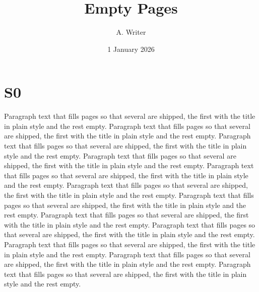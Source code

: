 \documentclass{article}
\title{Empty Pages}\author{A. Writer}\date{1 January 2026}
\begin{document}
\maketitle
\section{S0}
Paragraph text that fills pages so that several are shipped, the first with the title in plain style and the rest empty. Paragraph text that fills pages so that several are shipped, the first with the title in plain style and the rest empty. Paragraph text that fills pages so that several are shipped, the first with the title in plain style and the rest empty. Paragraph text that fills pages so that several are shipped, the first with the title in plain style and the rest empty. Paragraph text that fills pages so that several are shipped, the first with the title in plain style and the rest empty. Paragraph text that fills pages so that several are shipped, the first with the title in plain style and the rest empty. Paragraph text that fills pages so that several are shipped, the first with the title in plain style and the rest empty. Paragraph text that fills pages so that several are shipped, the first with the title in plain style and the rest empty. Paragraph text that fills pages so that several are shipped, the first with the title in plain style and the rest empty. Paragraph text that fills pages so that several are shipped, the first with the title in plain style and the rest empty. Paragraph text that fills pages so that several are shipped, the first with the title in plain style and the rest empty. Paragraph text that fills pages so that several are shipped, the first with the title in plain style and the rest empty. 
\end{document}
